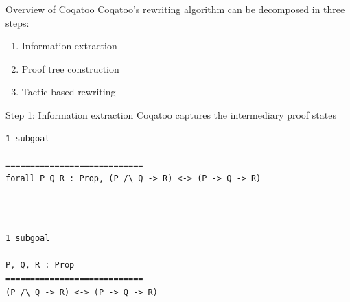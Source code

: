 \documentclass[pdf]{beamer}
\begin{document}
\begin{frame}{Overview of Coqatoo}
    Coqatoo's rewriting algorithm can be decomposed in three steps:
    \begin{enumerate}
        \item Information extraction
        \item Proof tree construction
        \item Tactic-based rewriting
    \end{enumerate}
\end{frame}


\begin{frame}[fragile]{Step 1: Information extraction}
Coqatoo captures the intermediary proof states
\begin{adjustbox}{minipage=\linewidth,bgcolor=coqatoo-gray,trim=-3pt 5pt -3pt 5pt}
\begin{lstlisting}[label=listing:before-intros]
1 subgoal

============================
forall P Q R : Prop, (P /\ Q -> R) <-> (P -> Q -> R)
\end{lstlisting}
\end{adjustbox}
~\\~\\
\begin{adjustbox}{minipage=\linewidth,bgcolor=coqatoo-gray,trim=-3pt 5pt -3pt 5pt}
\begin{lstlisting}[label=listing:after-intros]
1 subgoal

P, Q, R : Prop
============================
(P /\ Q -> R) <-> (P -> Q -> R)
\end{lstlisting}
\end{adjustbox}
\end{frame}
\end{document}

